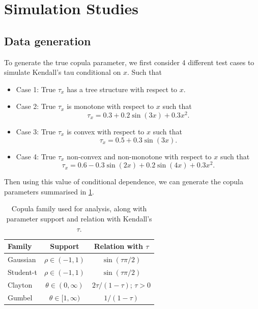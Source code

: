 \documentclass{amsart}
\begin{document}
\section{Simulation Studies}

\subsection{Data generation}

To generate the true copula parameter, we first consider 4 different test cases to simulate Kendall's tau conditional on $x$. Such that
 
\begin{itemize}
    \item Case 1: True $\tau_x$ has a tree structure with respect to $x$.
    \item Case 2: True $\tau_x$ is monotone with respect to $x$ such that 
    \begin{equation}\label{eq:synth:tau_x:case2}
        \tau_x = 0.3 + 0.2 \sin(3x) + 0.3x^2.
    \end{equation}
    \item Case 3: True $\tau_x$ is convex with respect to $x$ such that 
    \begin{equation}\label{eq:synth:tau_x:case3}
        \tau_x = 0.5 + 0.3 \sin(3x).
    \end{equation}
    \item Case 4: True $\tau_x$ non-convex and non-monotone with respect to $x$ such that 
    \begin{equation}\label{eq:synth:tau_x:case4}
        \tau_x = 0.6 - 0.3 \sin(2x) + 0.2 \sin(4x) + 0.3 x^2.
    \end{equation}
\end{itemize}

Then using this value of conditional dependence, we can generate the copula parameters summarised in \cref{tab:cop:link}.

\begin{table}
    \centering
    \begin{tabular}{l|c|c}
    \toprule
        Family & Support & Relation with $\tau$ \\
         \midrule
        Gaussian & $\rho \in (-1,1)$ & $\sin(\tau\pi/2)$ \\
        Student-t & $\rho \in (-1,1)$ & $\sin(\tau\pi/2)$ \\
        Clayton & $\theta \in (0,\infty)$ & $2\tau/(1-\tau)$; $\tau>0$ \\
        Gumbel & $\theta\in [1,\infty)$ & $1/(1-\tau)$ \\
        \bottomrule
    \end{tabular}
    \caption{Copula family used for analysis, along with parameter support and relation with Kendall's $\tau$.}
    \label{tab:cop:link}
\end{table}
\end{document}
